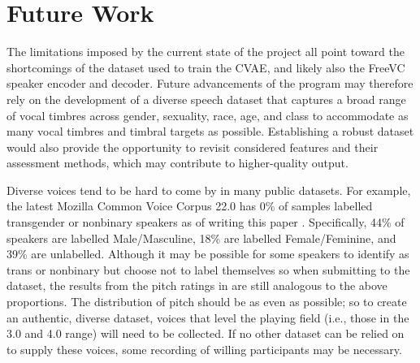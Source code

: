 \documentclass{article}
\begin{document}
\section{Future Work}


The limitations imposed by the current state of the project all point toward the shortcomings of the dataset used to train the CVAE, and likely also the FreeVC speaker encoder and decoder. Future advancements of the program may therefore rely on the development of a diverse speech dataset that captures a broad range of vocal timbres across gender, sexuality, race, age, and class to accommodate as many vocal timbres and timbral targets as possible. Establishing a robust dataset would also provide the opportunity to revisit considered features and their assessment methods, which may contribute to higher-quality output.

Diverse voices tend to be hard to come by in many public datasets. For example, the latest Mozilla Common Voice Corpus 22.0 has 0\% of samples labelled transgender or nonbinary speakers as of writing this paper \cite{mozilla2025}. Specifically, 44\% of speakers are labelled Male/Masculine, 18\% are labelled Female/Feminine, and 39\% are unlabelled. Although it may be possible for some speakers to identify as trans or nonbinary but choose not to label themselves so when submitting to the dataset, the results from the pitch ratings in  are still analogous to the above proportions. The distribution of pitch should be as even as possible; so to create an authentic, diverse dataset, voices that level the playing field (i.e., those in the 3.0 and 4.0 range) will need to be collected. If no other dataset can be relied on to supply these voices, some recording of willing participants may be necessary.
\end{document}
